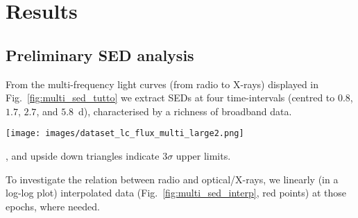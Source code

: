 \documentclass{aa}
\begin{document}
\section{Results}
\label{par:results}


\subsection{Preliminary SED analysis}
\label{par:prelim_analysis}

From the multi-frequency light curves (from radio to X-rays) displayed in Fig.~\ref{fig:multi_sed_tutto} we extract SEDs at four time-intervals (centred to $0.8$, $1.7$, $2.7$, and $5.8$~d), characterised by a richness of broadband data.
%
\begin{figure*} %
\centering
{\texttt{[image: images/dataset\_lc\_flux\_multi\_large2.png]}}
\caption{GRB\,160131A light curves from radio to X-rays.
Yellow shaded areas show the time intervals (centred to $0.8$~d, $1.7$~d, $2.7$~d, and $5.8$~d) where SEDs have been empirically analysed.
Filled circles indicate detections (uncertainties are smaller than the corresponding symbol sizes), connected with each other through a segment}, and upside down triangles indicate $3\sigma$ upper limits.
\label{fig:multi_sed_tutto}
\end{figure*}
%
To investigate the relation between radio and optical/X-rays, we linearly (in a log-log plot) interpolated data (Fig.~\ref{fig:multi_sed_interp}, red points) at those epochs, where needed.
\end{document}
